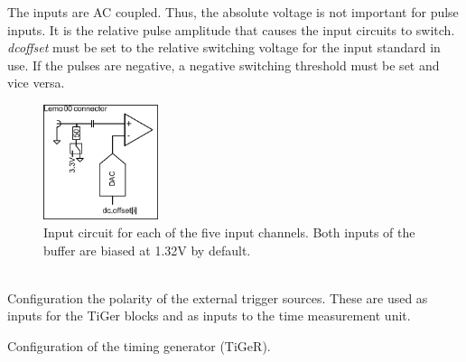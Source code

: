 			 \noindent The inputs are AC coupled. Thus, the absolute voltage is not important for pulse inputs. It is the relative pulse amplitude that causes the input circuits to switch. \textit{dc\tu offset} must be set to the relative switching voltage for the input standard in use. If the pulses are negative, a negative switching threshold must be set and vice versa.
			\begin{figure}
				\begin{center}
					\includegraphics[width=0.3\textwidth]{figures/InputCircuit.pdf}
					\caption{Input circuit for each of the five input channels. Both inputs of the buffer are biased at 1.32V by default.\label{fig:dcoffset1}}
				\end{center}
			\end{figure}

			\\
			Configuration the polarity of the external trigger sources.
			These are used as inputs for the TiGer blocks and as inputs to the time measurement unit.\par

			Configuration of the timing generator (TiGeR).

